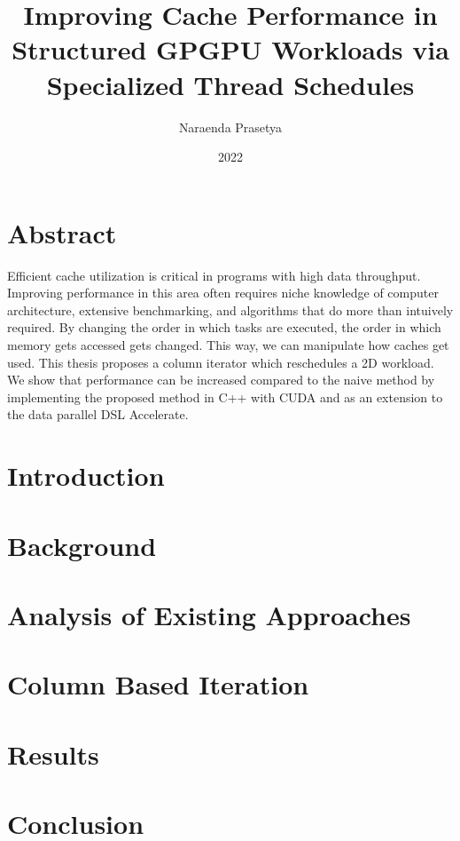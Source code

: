 \documentclass{report}
\title{Improving Cache Performance in Structured GPGPU Workloads via Specialized Thread Schedules}
\author{Naraenda Prasetya}
\date{2022}
\begin{document}
\maketitle

\chapter*{Abstract}
Efficient cache utilization is critical in programs with high data throughput.
Improving performance in this area often requires niche knowledge of computer architecture, extensive benchmarking, and algorithms that do more than intuively required.
By changing the order in which tasks are executed, the order in which memory gets accessed gets changed.
This way, we can manipulate how caches get used.
This thesis proposes a column iterator which reschedules a 2D workload.
We show that performance can be increased compared to the naive method by implementing the proposed method in C++ with CUDA and as an extension to the data parallel DSL Accelerate.

\tableofcontents

\chapter{Introduction}
\label{chap:introduction}


\chapter{Background}
\label{chap:background}


\chapter{Analysis of Existing Approaches}
\label{chap:analysis}


\chapter{Column Based Iteration}
\label{chap:cbi}


\chapter{Results}
\label{chap:results}


\chapter{Conclusion}
\label{chap:conclusion}




\end{document}
